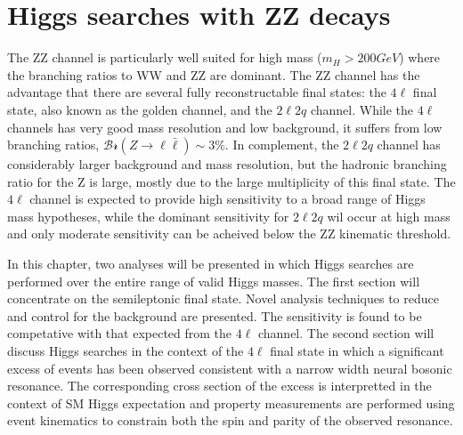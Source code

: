 \chapter{Higgs searches with ZZ decays}
\label{sec:HZZsearches}

The ZZ channel is particularly well suited for high mass ($m_H>200 GeV$)
where the branching ratios to WW and ZZ are dominant.  The ZZ channel 
has the advantage that there are several fully reconstructable final
states: the $4\ell$ final state, also known as the golden channel, and
the $2\ell 2q$ channel.  While the $4\ell$ channels has very good 
mass resolution and low background, it suffers from low branching ratios,
$\mathscr{Br}(Z\to \ell\bar{\ell})\sim3$\%.  In complement, the $2\ell2q$
channel has considerably larger background and mass resolution, but the
hadronic branching ratio for the Z is large, mostly due to the large 
multiplicity of this final state.  The $4\ell$ channel is expected to 
provide high sensitivity to a broad range of Higgs mass hypotheses, while
the dominant sensitivity for $2\ell 2q$ wil occur at high mass and only 
moderate sensitivity can be acheived below the ZZ kinematic threshold.

In this chapter, two analyses will be presented in which Higgs searches
are performed over the entire range of valid Higgs masses.  The first 
section will concentrate on the semileptonic final state.  Novel analysis
techniques to reduce and control for the background are presented.  
The sensitivity is found to be competative with that expected from the 
$4\ell$ channel.  The second section will discuss Higgs searches in the 
context of the $4\ell$ final state in which a significant excess of 
events has been observed consistent with a narrow width neural bosonic
resonance.  The corresponding cross section of the excess
is interpretted in the context of SM Higgs expectation and property
measurements are performed using event kinematics to constrain both the 
spin and parity of the observed resonance. 

